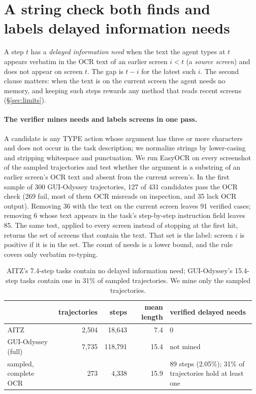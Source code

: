 \section{A string check both finds and labels delayed information needs}
\label{sec:needs}
A step $t$ has a \emph{delayed information need} when the text the agent types at $t$ appears verbatim in the OCR text of an earlier screen $i<t$ (a \emph{source screen}) and does not appear on screen $t$. The gap is $t-i$ for the latest such $i$. The second clause matters: when the text is on the current screen the agent needs no memory, and keeping such steps rewards any method that reads recent screens (\S\ref{sec:limits}).

\paragraph{The verifier mines needs and labels screens in one pass.} A candidate is any TYPE action whose argument has three or more characters and does not occur in the task description; we normalize strings by lower-casing and stripping whitespace and punctuation. We run EasyOCR on every screenshot of the sampled trajectories and test whether the argument is a substring of an earlier screen's OCR text and absent from the current screen's. In the first sample of 300 GUI-Odyssey trajectories, 127 of 431 candidates pass the OCR check (269 fail, most of them OCR misreads on inspection, and 35 lack OCR output). Removing 36 with the text on the current screen leaves 91 verified cases; removing 6 whose text appears in the task's step-by-step instruction field leaves 85. The same test, applied to every screen instead of stopping at the first hit, returns the set of screens that contain the text. That set is the label: screen $i$ is positive if it is in the set. The count of needs is a lower bound, and the rule covers only verbatim re-typing.

\begin{table}[t]
\centering\scriptsize
\caption{AITZ's 7.4-step tasks contain no delayed information need; GUI-Odyssey's 15.4-step tasks contain one in 31\% of sampled trajectories. We mine only the sampled trajectories.}
\label{tab:prev}
\begin{tabular}{lrrrl}
\toprule
 & trajectories & steps & mean length & verified delayed needs \\
\midrule
AITZ~\citep{aitz} & 2,504 & 18,643 & 7.4 & 0 \\
GUI-Odyssey~\citep{guiodyssey} (full) & 7,735 & 118,791 & 15.4 & not mined \\
\quad sampled, complete OCR & 273 & 4,338 & 15.9 & 89 steps (2.05\%); 31\% of trajectories hold at least one \\
\bottomrule
\end{tabular}
\end{table}


